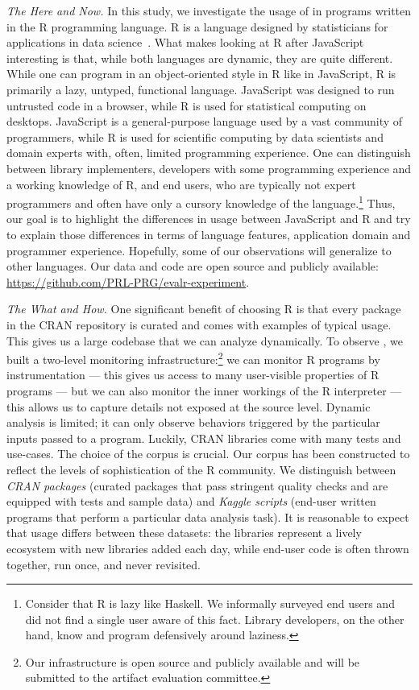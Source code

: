 \documentclass[review,screen,acmsmall]{acmart}
\begin{document}
\vspace{2mm}\noindent\emph{The Here and Now.} In this study, we investigate the
usage of \eval in programs written in the R programming language. R is a language
designed by statisticians for applications in data science~\cite{r,R96}. What
makes looking at R after JavaScript interesting is that, while both languages
are dynamic, they are quite different. While one can program in an
object-oriented style in R like in JavaScript, R is primarily a lazy, untyped,
functional language. JavaScript was designed to run untrusted code in a browser,
while R is used for statistical computing on desktops. JavaScript is a general-purpose language used by a vast community of programmers, while R is used for
scientific computing by data scientists and domain experts with, often, limited
programming experience. One can distinguish between library implementers,
developers with some programming experience and a working knowledge of R, and
end users, who are typically not expert programmers and often have only a
cursory knowledge of the language.\footnote{Consider that R is lazy like
Haskell. We informally surveyed end users and did not find a single user aware
of this fact. Library developers, on the other hand, know and program
defensively around laziness.} Thus, our goal is to highlight the differences in
usage between JavaScript and R and try to explain those differences in terms of
language features, application domain and programmer experience. Hopefully, some
of our observations will generalize to other languages.
Our data and code are open source and publicly
available: \url{https://github.com/PRL-PRG/evalr-experiment}.

\vspace{2mm}\noindent\emph{The What and How.} One significant benefit of
choosing R is that every package in the CRAN repository is curated and comes
with examples of typical usage. This gives us a large codebase that we can
analyze dynamically. To observe \eval, we built a two-level monitoring
infrastructure:\footnote{Our infrastructure is open source and publicly
available and  will be submitted to the artifact evaluation committee. } we can
monitor R programs by instrumentation --- this gives us access to many
user-visible properties of R programs --- but we can also monitor the
inner workings of the R interpreter --- this allows us to capture details not
exposed at the source level. Dynamic analysis is limited; it can only observe
behaviors triggered by the particular inputs passed to a program. Luckily, CRAN
libraries come with many tests and use-cases. The choice of the corpus is crucial.
Our corpus has been constructed to reflect the levels of sophistication of the R
community. We distinguish between \emph{CRAN packages} (\CranPackages curated
packages that pass stringent quality checks and are equipped with tests and
sample data) and \emph{Kaggle scripts} (\KaggleUnique end-user written programs
that perform a particular data analysis task). It is reasonable to expect that
\eval usage differs between these datasets: the libraries represent a lively
ecosystem with new libraries added each day, while end-user code is often thrown
together, run once, and never revisited.
\end{document}
